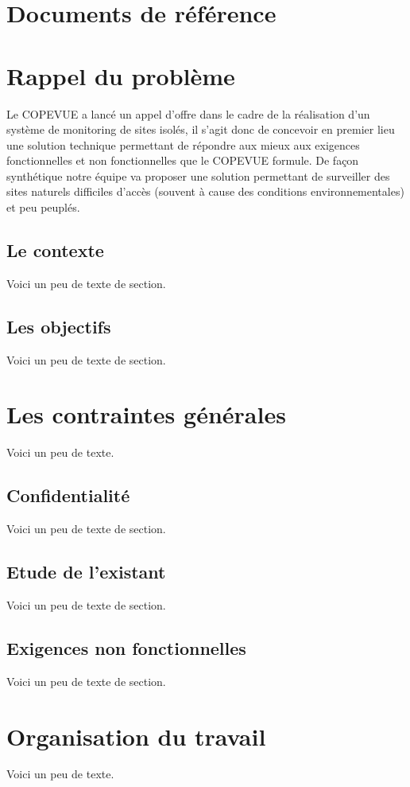    \chapter{Documents de référence}
    
    \chapter{Rappel du problème}
Le COPEVUE a lancé un appel d'offre dans le cadre de la réalisation d'un système de monitoring de sites isolés, il s'agit donc de concevoir en premier lieu une solution technique permettant de répondre aux mieux aux exigences fonctionnelles et non fonctionnelles que le COPEVUE formule. De façon synthétique notre équipe va proposer une solution permettant de surveiller des sites naturels difficiles d'accès (souvent à cause des conditions environnementales) et peu peuplés. 
    \section{Le contexte}
    Voici un peu de texte de section.
    \section{Les objectifs}
    Voici un peu de texte de section.
    
    \chapter{Les contraintes générales}
    Voici un peu de texte.
    \section{Confidentialité}
    Voici un peu de texte de section.
    \section{Etude de l'existant}
    Voici un peu de texte de section.
    \section{Exigences non fonctionnelles}
    Voici un peu de texte de section.
    
    \chapter{Organisation du travail}
    Voici un peu de texte.
